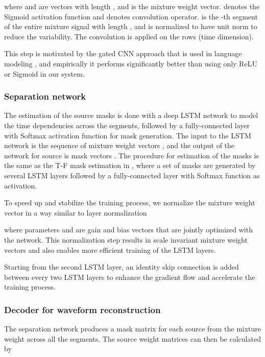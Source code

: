 \documentclass{article}
\begin{document}
where  and  are  vectors with length , and  is the mixture weight vector.  denotes the Sigmoid activation function and  denotes convolution operator.  is the -th segment of the entire mixture signal  with length , and is normalized to have unit  norm to reduce the variability. The convolution is applied on the rows (time dimension).

This step is motivated by the gated CNN approach that is used in language modeling \cite{dauphin2017language}, and empirically it performs significantly better than using only ReLU or Sigmoid in our system. 

\subsubsection{Separation network}
\label{sec:source}
The estimation of the source masks is done with a deep LSTM network to model the time dependencies across the  segments, followed by a fully-connected layer with Softmax activation function for mask generation. The input to the LSTM network is the sequence of  mixture weight vectors , and the output of the network for source  is  mask vectors . The procedure for estimation of the masks is the same as the T-F mask estimation in \cite{kolbaek2017multitalker}, where a set of masks are generated by several LSTM layers followed by a fully-connected layer with Softmax function as activation.

To speed up and stabilize the training process, we normalize the mixture weight vector  in a way similar to layer normalization \cite{ba2016layer}

where parameters  and  are gain and bias vectors that are jointly optimized with the network. This normalization step results in scale invariant mixture weight vectors and also enables more efficient training of the LSTM layers.





Starting from the second LSTM layer, an identity skip connection \cite{he2016identity} is added between every two LSTM layers to enhance the gradient flow and accelerate the training process.

\subsubsection{Decoder for waveform reconstruction}
\label{sec:syn}

The separation network produces a mask matrix for each source   from the mixture weight  across all the  segments. The source weight matrices can then be calculated by
\end{document}

